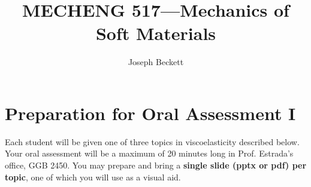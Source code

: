 \documentclass[preprint,12pt,authoryear]{elsarticle}
\begin{document}
\begin{frontmatter}

\title{MECHENG 517---Mechanics of Soft Materials} %

\author{Joseph Beckett} 










\end{frontmatter}

\section*{Preparation for Oral Assessment I}

Each student will be given one of three topics in viscoelasticity described below.  
Your oral assessment will be a maximum of 20 minutes long in Prof. Estrada's office, GGB 2450. 
You may prepare and bring a \textbf{single slide (pptx or pdf) per topic}, one of which you will use as a visual aid. 
\end{document}
